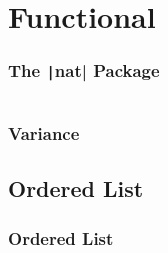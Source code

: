 \documentclass[10pt, usenames, dvipsnames, table]{beamer}
\begin{document}
\section{Functional}
\begin{frame}
  \frametitle{The \texttt|nat| Package}
  \inputminted[firstline=1, lastline=30, fontsize=\tiny]
  {Scala}{../examples/Nat.scala}
\end{frame}



\begin{frame}
  \frametitle{Variance}
\end{frame}

\subsection{Ordered List}
\begin{frame}
  \frametitle{Ordered List}
  \inputminted[firstline=1, fontsize=\tiny]
  {Scala}{../examples/OrderedList.scala}
\end{frame}
\end{document}
